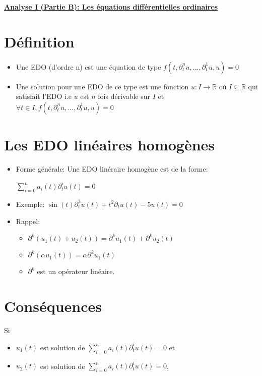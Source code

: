 \documentclass[a4paper,11pt]{report}
\begin{document}
\renewcommand{\labelitemi}{$\cdot$}
\begin{Large}\begin{center} 
   \underline{\textbf{Analyse I (Partie B): Les équations différentielles ordinaires}} 
\end{center}\end{Large}

\section{Définition}
\begin{itemize}
	\item Une EDO (d'ordre n) est une équation de type $f(t,\partial_t^nu,...,\partial_t^1u,u)=0$
	\item Une solution pour une EDO de ce type est une fonction $u:I\rightarrow\mathbb{R}$ où $I\subseteq\mathbb{R}$ qui satisfait l'EDO i.e $u$ est $n$ fois dérivable sur $I$ et $\forall t \in I,f(t,\partial_t^nu,...,\partial_t^1u,u)=0$
\end{itemize}

\section{Les EDO linéaires homogènes}
\begin{itemize}
	\item Forme générale: Une EDO linéraire homogène est de la forme:\\
	\begin{center}
	$\sum\limits_{i=0}^n a_i(t)\partial_t^iu(t)=0$
	\end{center}
	\item Exemple: $\sin(t)\partial_t^3u(t)+t^2\partial_t u(t)-5 u(t)=0$
	\item Rappel:
	\begin{itemize}
		\item $\partial^k(u_1(t)+u_2(t)) = \partial^k u_1(t) + \partial^k u_2(t)$
		\item $\partial^k(\alpha u_1(t)) = \alpha \partial^k u_1(t)$
		\item $\partial^k$ est un opérateur linéaire.
	\end{itemize}
\end{itemize}

\section{Conséquences}
Si 
\begin{itemize}
\item $u_1(t)$ est solution de $\sum\limits_{i=0}^n a_i(t) \partial_t^i u(t) = 0$ et 
\item $u_2(t)$ est solution de $\sum\limits_{i=0}^n a_i(t) \partial_t^i u(t) = 0$, 
\end{itemize}
\end{document}
